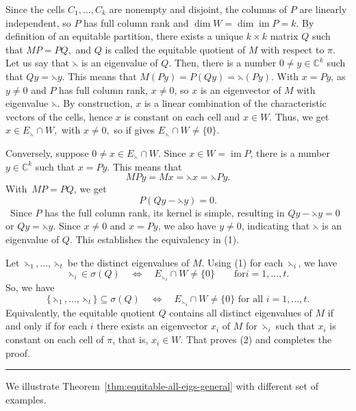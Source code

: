 \documentclass[12pt,twoside]{article}
\renewenvironment{proof}{{\noindent\bfseries Proof.}}{\qed}
\def\qed{\nolinebreak\hfill\rule{.2cm}{.2cm}\par\addvspace{.5cm}}
\begin{document}
\begin{proof}
	Since the cells $C_1,\dots,C_k$ are nonempty and disjoint, the columns of $P$ are linearly independent, so $P$ has full column rank and $\dim W = \dim\operatorname{im}P = k.$ 
	By definition of an equitable partition, there exists a unique $k\times k$ matrix $Q$ such that $MP = P Q,$
	 and $Q$ is called the equitable quotient of $M$ with respect to $\pi$. Let us say that $\leftthreetimes$ is an eigenvalue of $Q$. Then, there is a number $0\neq y\in\mathbb{C}^k$ such that $Qy = \leftthreetimes y.$ This means that $M(P y) = P(Q y) = \leftthreetimes (P y).$
	With $x  = P y$, as $y\neq 0$ and $P$ has full column rank, $x\neq 0$, so $x$
	is an eigenvector of $M$ with eigenvalue $\leftthreetimes$. By construction, $x$ is a
	linear combination of the characteristic vectors of the cells, hence $x$ is
	constant on each cell and $x\in W$. Thus, we get  $x\in E_\leftthreetimes\cap W,$ with $x\neq 0,$ so if gives $E_\leftthreetimes\cap W\neq\{0\}$.
	
	Conversely, suppose $0\neq x\in E_\leftthreetimes\cap W$. Since $x\in W=\operatorname{im}P$, there is a number $y\in\mathbb{C}^k$ such that $x=P y$. This means that $$ M P y = M x = \leftthreetimes x = \leftthreetimes P y.$$ With $MP = PQ$, we get $$ P(Q y - \leftthreetimes y) = 0.$$ Since $P$ has the full column rank, its kernel is simple, resulting in $Qy-\leftthreetimes y=0$ or $Qy = \leftthreetimes y.$ Since $x\neq 0$ and $x=P y$, we also have $y\neq 0$, indicating that $\leftthreetimes$ is an eigenvalue of $Q$. This establishes the equivalency in (1).
	
	
	Let $\leftthreetimes_1,\dots,\leftthreetimes_t$ be the distinct eigenvalues of $M$. Using	(1) for each $\leftthreetimes_i$, we have
	$$
	\leftthreetimes_i\in\sigma(Q)
	\quad\Longleftrightarrow\quad
	E_{\leftthreetimes_i}\cap W\neq\{0\}
	\qquad \text{for} i=1,\dots,t.
	$$
	So, we have
	$$
	\{\leftthreetimes_1,\dots,\leftthreetimes_t\}\subseteq\sigma(Q)
	\quad\Longleftrightarrow\quad
	E_{\leftthreetimes_i}\cap W\neq\{0\}\text{ for all }i=1,\dots,t.
	$$
	Equivalently, the equitable quotient $Q$ contains all distinct eigenvalues of
	$M$ if and only if for each $i$ there exists an eigenvector $x_i$ of $M$ for
	$\leftthreetimes_i$ such that $x_i$ is constant on each cell of $\pi$, that is, 
	$x_i\in W$. That proves (2) and completes the proof.
\end{proof}


	We illustrate Theorem~\ref{thm:equitable-all-eigs-general} with different set of examples.
	
\end{document}
